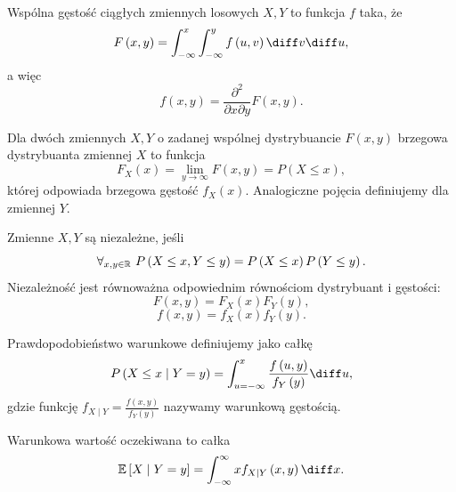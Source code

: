 \begin{definition}
	Wspólna gęstość ciągłych zmiennych losowych \(X,Y\) to funkcja \(f\) taka, że
	\[ F\left( x,y \right) = \int_{-\infty}^{x} \int_{-\infty}^{y} f\left( u,v \right) \diff v \diff u  ,\]
	a więc
	\[ f\left( x,y \right) = \frac{\partial ^2}{\partial x\partial y } F\left( x,y \right)  .\]
\end{definition}

\begin{definition}
	Dla dwóch zmiennych \(X,Y\) o zadanej wspólnej dystrybuancie \(F\left( x,y \right) \) brzegowa dystrybuanta zmiennej \(X\) to funkcja
	\[ F_X\left( x  \right) = \lim_{y \to \infty} F\left( x,y \right) = P\left( X\le x \right)  ,\]
	której odpowiada brzegowa gęstość \(f_X\left( x  \right) \). Analogiczne pojęcia definiujemy dla zmiennej \(Y\).
\end{definition}

\begin{definition}
	Zmienne \(X,Y\) są niezależne, jeśli
	\[ \forall_{x,y\in \R} \ P\left( X\le x , Y\le y  \right) = P\left( X\le x  \right) P\left( Y\le y  \right) .  \]
	Niezależność jest równoważna odpowiednim równościom dystrybuant i gęstości:
	\[ F\left( x,y \right) = F_X\left( x  \right) F_Y\left( y \right)  ,\]
	\[ f\left( x,y \right) = f_X\left( x  \right) f_Y\left( y \right)  .\]
\end{definition}


\begin{definition}
	Prawdopodobieństwo warunkowe definiujemy jako całkę
	\[ P\left( X\le x \mid Y=y \right) = \int_{u=-\infty}^{x} \frac{f\left( u,y \right)}{f_Y\left( y  \right) }\diff u, \]
	gdzie funkcję \(f_{X\mid Y} = \frac{f\left( x,y \right) }{f_Y\left( y \right) }\) nazywamy warunkową gęstością.
\end{definition}

\begin{definition}
	Warunkowa wartość oczekiwana to całka
	\[ \mathbb{E}\left[ X \mid Y=y \right] = \int_{-\infty}^{\infty} x f_{X\mid Y}\left( x,y \right) \diff x  .\]
\end{definition}


